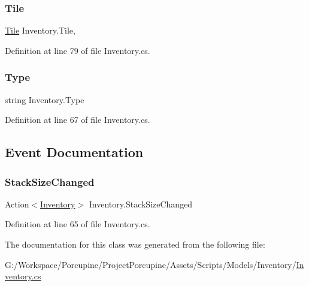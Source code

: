\subsubsection{\texorpdfstring{Tile}{Tile}}
{\footnotesize\ttfamily \hyperlink{class_tile}{Tile} Inventory.\+Tile\hspace{0.3cm}{\ttfamily [get]}, {\ttfamily [set]}}



Definition at line 79 of file Inventory.\+cs.

\mbox{\label{class_inventory_a6ce84e5edd07997e764ef8f0f3a047c5}} 
\subsubsection{\texorpdfstring{Type}{Type}}
{\footnotesize\ttfamily string Inventory.\+Type\hspace{0.3cm}{\ttfamily [get]}}



Definition at line 67 of file Inventory.\+cs.



\subsection{Event Documentation}
\mbox{\label{class_inventory_a11987d6b238ea819af32fda62b1f13eb}} 
\subsubsection{\texorpdfstring{Stack\+Size\+Changed}{StackSizeChanged}}
{\footnotesize\ttfamily Action$<$\hyperlink{class_inventory}{Inventory}$>$ Inventory.\+Stack\+Size\+Changed}



Definition at line 65 of file Inventory.\+cs.



The documentation for this class was generated from the following file\+:\begin{DoxyCompactItemize}
\item 
G\+:/\+Workspace/\+Porcupine/\+Project\+Porcupine/\+Assets/\+Scripts/\+Models/\+Inventory/\hyperlink{_inventory_8cs}{Inventory.\+cs}\end{DoxyCompactItemize}
